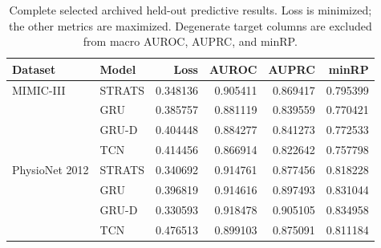 \begin{table}[H] \centering \small
\caption{Complete selected archived held-out predictive results. Loss is minimized; the other metrics are maximized. Degenerate target columns are excluded from macro AUROC, AUPRC, and minRP.}\label{tab:supp-predictive}
\begin{tabular}{llrrrr} \toprule Dataset & Model & Loss & AUROC & AUPRC & minRP\\ \midrule
MIMIC-III & STRATS & 0.348136 & 0.905411 & 0.869417 & 0.795399\\
 & GRU & 0.385757 & 0.881119 & 0.839559 & 0.770421\\
 & GRU-D & 0.404448 & 0.884277 & 0.841273 & 0.772533\\
 & TCN & 0.414456 & 0.866914 & 0.822642 & 0.757798\\
PhysioNet 2012 & STRATS & 0.340692 & 0.914761 & 0.877456 & 0.818228\\
 & GRU & 0.396819 & 0.914616 & 0.897493 & 0.831044\\
 & GRU-D & 0.330593 & 0.918478 & 0.905105 & 0.834958\\
 & TCN & 0.476513 & 0.899103 & 0.875091 & 0.811184\\
\bottomrule \end{tabular}
\end{table}
